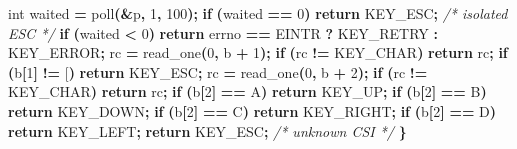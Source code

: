 \documentclass[
  oneside,
  openany]{book}
\newenvironment{Shaded}{\begin{snugshade}}{\end{snugshade}}
\newcommand{\CharTok}[1]{\textcolor[rgb]{0.31,0.60,0.02}{#1}}
\newcommand{\CommentTok}[1]{\textcolor[rgb]{0.56,0.35,0.01}{\textit{#1}}}
\newcommand{\ControlFlowTok}[1]{\textcolor[rgb]{0.13,0.29,0.53}{\textbf{#1}}}
\newcommand{\DataTypeTok}[1]{\textcolor[rgb]{0.13,0.29,0.53}{#1}}
\newcommand{\DecValTok}[1]{\textcolor[rgb]{0.00,0.00,0.81}{#1}}
\newcommand{\NormalTok}[1]{#1}
\newcommand{\OperatorTok}[1]{\textcolor[rgb]{0.81,0.36,0.00}{\textbf{#1}}}
\begin{document}
\begin{Shaded}
\begin{Highlighting}[]
    \DataTypeTok{int}\NormalTok{ waited }\OperatorTok{=}\NormalTok{ poll}\OperatorTok{(\&}\NormalTok{p}\OperatorTok{,} \DecValTok{1}\OperatorTok{,} \DecValTok{100}\OperatorTok{);}
    \ControlFlowTok{if} \OperatorTok{(}\NormalTok{waited }\OperatorTok{==} \DecValTok{0}\OperatorTok{)} \ControlFlowTok{return}\NormalTok{ KEY\_ESC}\OperatorTok{;}       \CommentTok{/* isolated ESC */}
    \ControlFlowTok{if} \OperatorTok{(}\NormalTok{waited }\OperatorTok{\textless{}} \DecValTok{0}\OperatorTok{)} \ControlFlowTok{return}\NormalTok{ errno }\OperatorTok{==}\NormalTok{ EINTR }\OperatorTok{?}\NormalTok{ KEY\_RETRY }\OperatorTok{:}\NormalTok{ KEY\_ERROR}\OperatorTok{;}
\NormalTok{    rc }\OperatorTok{=}\NormalTok{ read\_one}\OperatorTok{(}\DecValTok{0}\OperatorTok{,}\NormalTok{ b }\OperatorTok{+} \DecValTok{1}\OperatorTok{);} \ControlFlowTok{if} \OperatorTok{(}\NormalTok{rc }\OperatorTok{!=}\NormalTok{ KEY\_CHAR}\OperatorTok{)} \ControlFlowTok{return}\NormalTok{ rc}\OperatorTok{;}
    \ControlFlowTok{if} \OperatorTok{(}\NormalTok{b}\OperatorTok{[}\DecValTok{1}\OperatorTok{]} \OperatorTok{!=} \CharTok{\textquotesingle{}[\textquotesingle{}}\OperatorTok{)} \ControlFlowTok{return}\NormalTok{ KEY\_ESC}\OperatorTok{;}
\NormalTok{    rc }\OperatorTok{=}\NormalTok{ read\_one}\OperatorTok{(}\DecValTok{0}\OperatorTok{,}\NormalTok{ b }\OperatorTok{+} \DecValTok{2}\OperatorTok{);} \ControlFlowTok{if} \OperatorTok{(}\NormalTok{rc }\OperatorTok{!=}\NormalTok{ KEY\_CHAR}\OperatorTok{)} \ControlFlowTok{return}\NormalTok{ rc}\OperatorTok{;}
    \ControlFlowTok{if} \OperatorTok{(}\NormalTok{b}\OperatorTok{[}\DecValTok{2}\OperatorTok{]} \OperatorTok{==} \CharTok{\textquotesingle{}A\textquotesingle{}}\OperatorTok{)} \ControlFlowTok{return}\NormalTok{ KEY\_UP}\OperatorTok{;}
    \ControlFlowTok{if} \OperatorTok{(}\NormalTok{b}\OperatorTok{[}\DecValTok{2}\OperatorTok{]} \OperatorTok{==} \CharTok{\textquotesingle{}B\textquotesingle{}}\OperatorTok{)} \ControlFlowTok{return}\NormalTok{ KEY\_DOWN}\OperatorTok{;}
    \ControlFlowTok{if} \OperatorTok{(}\NormalTok{b}\OperatorTok{[}\DecValTok{2}\OperatorTok{]} \OperatorTok{==} \CharTok{\textquotesingle{}C\textquotesingle{}}\OperatorTok{)} \ControlFlowTok{return}\NormalTok{ KEY\_RIGHT}\OperatorTok{;}
    \ControlFlowTok{if} \OperatorTok{(}\NormalTok{b}\OperatorTok{[}\DecValTok{2}\OperatorTok{]} \OperatorTok{==} \CharTok{\textquotesingle{}D\textquotesingle{}}\OperatorTok{)} \ControlFlowTok{return}\NormalTok{ KEY\_LEFT}\OperatorTok{;}
    \ControlFlowTok{return}\NormalTok{ KEY\_ESC}\OperatorTok{;}                        \CommentTok{/* unknown CSI */}
\OperatorTok{\}}
\end{Highlighting}
\end{Shaded}
\end{document}
